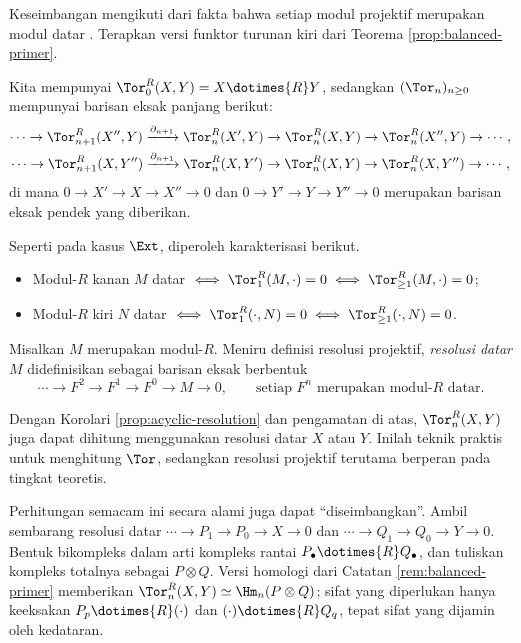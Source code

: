 \begin{bukti}
Keseimbangan mengikuti dari fakta bahwa setiap modul projektif merupakan
modul datar \cite[Korolari 6.9.9]{Li1}. Terapkan versi funktor turunan kiri
dari Teorema \ref{prop:balanced-primer}.
\end{bukti}

Kita mempunyai $\Tor^R_0(X,Y)=X\dotimes{R}Y$, sedangkan $(\Tor_n)_{n\geq0}$
mempunyai barisan eksak panjang berikut:
\begin{gather*}
\cdots\to\Tor^R_{n+1}(X'',Y)\xrightarrow{\partial_{n+1}}\Tor^R_n(X',Y)\to
\Tor^R_n(X,Y)\to\Tor^R_n(X'',Y)\to\cdots,\\
\cdots\to\Tor^R_{n+1}(X,Y'')\xrightarrow{\partial_{n+1}}\Tor^R_n(X,Y')\to
\Tor^R_n(X,Y)\to\Tor^R_n(X,Y'')\to\cdots,
\end{gather*}
di mana $0\to X'\to X\to X''\to0$ dan
$0\to Y'\to Y\to Y''\to0$ merupakan barisan eksak pendek yang diberikan.

Seperti pada kasus $\Ext$, diperoleh karakterisasi berikut.

\begin{itemize}
\item Modul-$R$ kanan $M$ datar $\iff \Tor^R_1(M,\cdot)=0\iff
\Tor^R_{\geq1}(M,\cdot)=0$;
\item Modul-$R$ kiri $N$ datar $\iff \Tor^R_1(\cdot,N)=0\iff
\Tor^R_{\geq1}(\cdot,N)=0$.
\end{itemize}

Misalkan $M$ merupakan modul-$R$. Meniru definisi resolusi projektif,
\emph{resolusi datar}
$M$ didefinisikan sebagai barisan eksak berbentuk
\[
\cdots\to F^2\to F^1\to F^0\to M\to0,\qquad
\text{setiap $F^n$ merupakan modul-$R$ datar}.
\]

Dengan Korolari \ref{prop:acyclic-resolution} dan pengamatan di atas,
$\Tor^R_n(X,Y)$ juga dapat dihitung menggunakan resolusi datar $X$ atau $Y$.
Inilah teknik praktis untuk menghitung $\Tor$, sedangkan resolusi projektif
terutama berperan pada tingkat teoretis.

Perhitungan semacam ini secara alami juga dapat ``diseimbangkan''. Ambil
sembarang resolusi datar $\cdots\to P_1\to P_0\to X\to0$ dan
$\cdots\to Q_1\to Q_0\to Y\to0$. Bentuk bikompleks dalam arti kompleks rantai
$P_\bullet\dotimes{R}Q_\bullet$, dan tuliskan kompleks totalnya sebagai
$P\otimes Q$. Versi homologi dari Catatan \ref{rem:balanced-primer}
memberikan $\Tor_n^R(X,Y)\simeq\Hm_n(P\otimes Q)$; sifat yang diperlukan hanya
keeksakan $P_p\dotimes{R}(\cdot)$ dan $(\cdot)\dotimes{R}Q_q$, tepat sifat
yang dijamin oleh kedataran.

